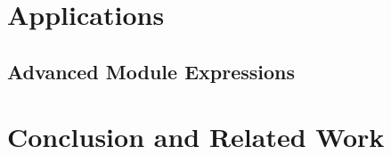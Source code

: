 \documentclass[orivec]{llncs}
\begin{document}
\section{Applications}\label{sec:appl}


\begin{modexp}
\section{Advanced Module Expressions}\label{sec:complex}

\end{modexp}

\section{Conclusion and Related Work}\label{sec:conc}





\end{document}
